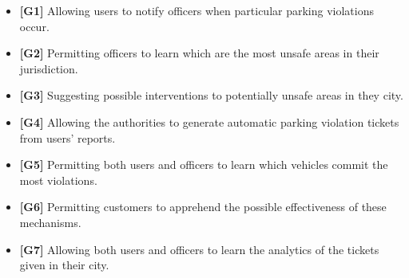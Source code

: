 \begin{itemize}

\item \textbf{[\hypertarget{G1}{G1}]} Allowing users to notify officers when particular parking violations occur.

\item \textbf{[\hypertarget{G2}{G2}]} Permitting officers to learn which are the most unsafe areas in their jurisdiction.

\item \textbf{[\hypertarget{G3}{G3}]} Suggesting possible interventions to potentially unsafe areas in they city.

\item \textbf{[\hypertarget{G4}{G4}]} Allowing the authorities to generate automatic parking violation tickets from users' reports.

\item \textbf{[\hypertarget{G5}{G5}]} Permitting both users and officers to learn which vehicles commit the most violations.

\item \textbf{[\hypertarget{G6}{G6}]} Permitting customers to apprehend the possible effectiveness of these mechanisms.

\item \textbf{[\hypertarget{G7}{G7}]} Allowing both users and officers to learn the analytics of the tickets given in their city.

\end{itemize}